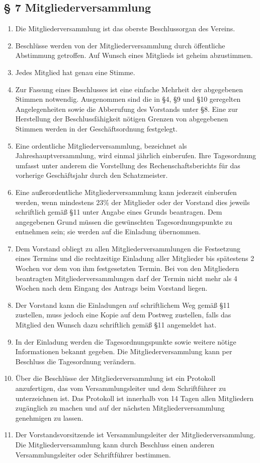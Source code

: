 ﻿\documentclass[10pt,a4paper]{scrartcl}
\begin{document}
\subsection*{§ 7 Mitgliederversammlung}
\begin{enumerate}

        \item Die Mitgliederversammlung ist das oberste Beschlussorgan des Vereins.
	\item Beschlüsse werden von der Mitgliederversammlung durch öffentliche Abstimmung getroffen.
		Auf Wunsch eines Mitglieds ist geheim abzustimmen.
	\item Jedes Mitglied hat genau eine Stimme.
	\item Zur Fassung eines Beschlusses ist eine einfache Mehrheit der abgegebenen Stimmen
             notwendig. Ausgenommen sind die in §4, §9 und §10 geregelten Angelegenheiten sowie die Abberufung des Vorstands unter §8. Eine
             zur Herstellung der Beschlussfähigkeit nötigen Grenzen von abgegebenen Stimmen
             werden in der Geschäftsordnung festgelegt.
	\item Eine ordentliche Mitgliederversammlung, bezeichnet als Jahreshauptversammlung,
		wird einmal jährlich einberufen. Ihre Tagesordnung umfasst unter anderem die
		Vorstellung des Rechenschaftsberichts für das vorherige Geschäftsjahr durch
		den Schatzmeister.
	\item Eine außerordentliche Mitgliederversammlung kann jederzeit einberufen werden, wenn
		mindestens 23\% der Mitglieder oder der Vorstand dies jeweils schriftlich gemäß §11
		unter Angabe eines Grunds beantragen. Dem angegebenen Grund müssen die gewünschten
		Tagesordnungspunkte zu entnehmen sein; sie werden auf die Einladung übernommen.
	\item Dem Vorstand obliegt zu allen Mitgliederversammlungen die Festsetzung eines Termins
		und die rechtzeitige Einladung aller Mitglieder bis spätestens 2 Wochen vor dem
		von ihm festgesetzten Termin. Bei von den Mitgliedern beantragten
                Mitgliederversammlungen darf der Termin nicht mehr als 4 Wochen nach dem Eingang
		des Antrags beim Vorstand liegen.
	\item Der Vorstand kann die Einladungen auf schriftlichem Weg gemäß §11 zustellen, muss
		jedoch eine Kopie auf dem Postweg zustellen, falls das Mitglied den Wunsch dazu
		schriftlich gemäß §11 angemeldet hat.
	\item In der Einladung werden die Tagesordnungspunkte sowie weitere nötige Informationen
		bekannt gegeben. Die Mitgliederversammlung kann per Beschluss die Tagesordnung
		ver\-ändern.
	\item Über die Beschlüsse der Mitgliederversammlung ist ein Protokoll anzufertigen,
		das vom Versammlungsleiter und dem Schriftführer zu unterzeichnen ist.
		Das Protokoll ist innerhalb von 14 Tagen allen Mitgliedern zugänglich zu
		machen und auf der nächsten Mitgliederversammlung genehmigen zu lassen.
	\item Der Vorstandsvorsitzende ist Versammlungsleiter der Mitgliederversammlung.
		Die Mitgliederversammlung kann durch Beschluss einen anderen Versammlungsleiter
		oder Schrift\-füh\-rer bestimmen.
\end{enumerate}
\end{document}
